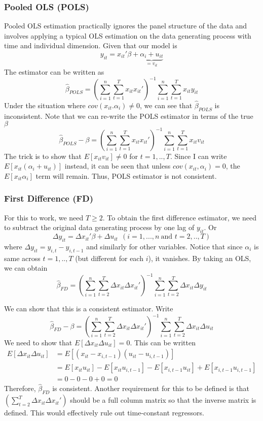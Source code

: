 \documentclass[12pt]{article}
\theoremstyle{definition}
\theoremstyle{property}
\theoremstyle{assumption}
\theoremstyle{example}
\theoremstyle{comment}
\begin{document}
\subsubsection{Pooled OLS (POLS)}
Pooled OLS estimation practically ignores the panel structure of the data and involves applying a typical OLS estimation on the data generating process with time and individual dimension. Given that our model is
\small{\[
y_{it}= x_{it}'\beta+\underbrace{\alpha_i+u_{it}}_{=v_{it}}
\]}\normalsize
The estimator can be written as
\small{\[
\hat{\beta}_{POLS}=\left(\sum_{i=1}^n\sum_{t=1}^T x_{it}x_{it}'\right)^{-1}\sum_{i=1}^n\sum_{t=1}^T x_{it}y_{it}
\]}\normalsize
Under the situation where $cov(x_{it}.\alpha_i)\neq 0$, we can see that $\hat{\beta}_{POLS}$ is inconsistent. Note that we can re-write the POLS estimator in terms of the true $\beta$ 
\footnotesize{\[
\hat{\beta}_{POLS}-\beta = \left(\sum_{i=1}^n\sum_{t=1}^T x_{it}x_{it}'\right)^{-1}\sum_{i=1}^n\sum_{t=1}^T x_{it}v_{it}
\]}\normalsize
The trick is to show that $E[x_{it}v_{it}]\neq0$ for $t=1,..,T$. Since I can write $E[x_{it}(\alpha_i+u_{it})]$ instead, it can be seen that unless $cov(x_{it},\alpha_i)=0$, the $E[x_{it}\alpha_i]$ term will remain. Thus, POLS estimator is not consistent. \par
\subsubsection{First Difference (FD)}
For this to work, we need $T\geq 2$. To obtain the first difference estimator, we need to subtract the original data generating process by one lag of $y_{it}$. Or
\[
\Delta y_{it}= \Delta x_{it}'\beta+\Delta u_{it}\ \ (i=1,...,n \ \text{and }t=2,..,T)
\]
where $\Delta y_{it} = y_{i,t}-y_{i,t-1}$ and similarly for other variables. Notice that since $\alpha_i$ is same across $t=1,..,T$ (but different for each $i$), it vanishes. By taking an OLS, we can obtain
\[
\hat{\beta}_{FD}=\left(\sum_{i=1}^n\sum_{t=2}^T \Delta x_{it}\Delta x_{it}'\right)^{-1}\sum_{i=1}^n\sum_{t=2}^T \Delta x_{it}\Delta y_{it}
\]
\par
We can show that this is a consistent estimator. Write
\[
\hat{\beta}_{FD}-\beta =\left(\sum_{i=1}^n\sum_{t=2}^T \Delta x_{it}\Delta x_{it}'\right)^{-1}\sum_{i=1}^n\sum_{t=2}^T \Delta x_{it}\Delta u_{it}
\]
We need to show that $E[\Delta x_{it} \Delta u_{it}]=0$. This can be written
\[
\begin{aligned}
E[\Delta x_{it} \Delta u_{it}]&=E[ (x_{it}-x_{i,t-1})( u_{it}-u_{i,t-1})]\\
&=E[ x_{it}u_{it}]-E[x_{it}u_{i,t-1}]-E[x_{i,t-1}u_{it}]+E[x_{i,t-1}u_{i,t-1}]\\
&= 0-0-0+0=0
\end{aligned}
\] 
Therefore, $\hat{\beta}_{FD}$ is consistent. Another requirement for this to be defined is that $\left(\sum_{t=2}^T \Delta x_{it}\Delta x_{it}'\right)$ should be a full column matrix so that the inverse matrix is defined. This would effectively rule out time-constant regressors. 
\end{document}
